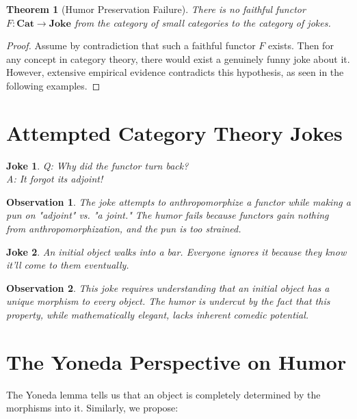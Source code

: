 \documentclass{article}
\newtheorem{theorem}{Theorem}
\newtheorem{joke}{Joke}
\newtheorem{observation}{Observation}
\begin{document}
\begin{theorem}[Humor Preservation Failure]
    There is no faithful functor $F: \mathbf{Cat} \to \mathbf{Joke}$ from the category of small categories to the category of jokes.
\end{theorem}

\begin{proof}
    Assume by contradiction that such a faithful functor $F$ exists. Then for any concept in category theory, there would exist a genuinely funny joke about it. However, extensive empirical evidence contradicts this hypothesis, as seen in the following examples.
\end{proof}

\section{Attempted Category Theory Jokes}

\begin{joke}
    Q: Why did the functor turn back?\\
    A: It forgot its adjoint!
\end{joke}

\begin{observation}
    The joke attempts to anthropomorphize a functor while making a pun on "adjoint" vs. "a joint." The humor fails because functors gain nothing from anthropomorphization, and the pun is too strained.
\end{observation}

\begin{joke}
    An initial object walks into a bar. Everyone ignores it because they know it'll come to them eventually.
\end{joke}

\begin{observation}
    This joke requires understanding that an initial object has a unique morphism to every object. The humor is undercut by the fact that this property, while mathematically elegant, lacks inherent comedic potential.
\end{observation}

\section{The Yoneda Perspective on Humor}

The Yoneda lemma tells us that an object is completely determined by the morphisms into it. Similarly, we propose:
\end{document}
